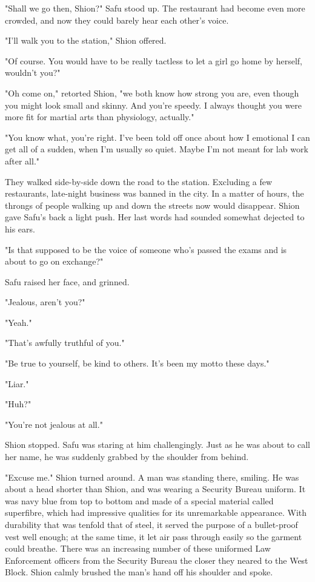 "Shall we go then, Shion?" Safu stood up. The restaurant had become even
more crowded, and now they could barely hear each other's voice.

"I'll walk you to the station," Shion offered.

"Of course. You would have to be really tactless to let a girl go home
by herself, wouldn't you?"

"Oh come on," retorted Shion, "we both know how strong you are, even
though you might look small and skinny. And you're speedy. I always
thought you were more fit for martial arts than physiology, actually."

"You know what, you're right. I've been told off once about how I
emotional I can get all of a sudden, when I'm usually so quiet. Maybe
I'm not meant for lab work after all."

They walked side-by-side down the road to the station. Excluding a few
restaurants, late-night business was banned in the city. In a matter of
hours, the throngs of people walking up and down the streets now would
disappear. Shion gave Safu's back a light push. Her last words had
sounded somewhat dejected to his ears.

"Is that supposed to be the voice of someone who's passed the exams and
is about to go on exchange?"

Safu raised her face, and grinned.

"Jealous, aren't you?"

"Yeah."

"That's awfully truthful of you."

"Be true to yourself, be kind to others. It's been my motto these days."

"Liar."

"Huh?"

"You're not jealous at all."

Shion stopped. Safu was staring at him challengingly. Just as he was
about to call her name, he was suddenly grabbed by the shoulder from
behind.

"Excuse me." Shion turned around. A man was standing there, smiling. He
was about a head shorter than Shion, and was wearing a Security Bureau
uniform. It was navy blue from top to bottom and made of a special
material called superfibre, which had impressive qualities for its
unremarkable appearance. With durability that was tenfold that of steel,
it served the purpose of a bullet-proof vest well enough; at the same
time, it let air pass through easily so the garment could breathe. There
was an increasing number of these uniformed Law Enforcement officers
from the Security Bureau the closer they neared to the West Block. Shion
calmly brushed the man's hand off his shoulder and spoke.


